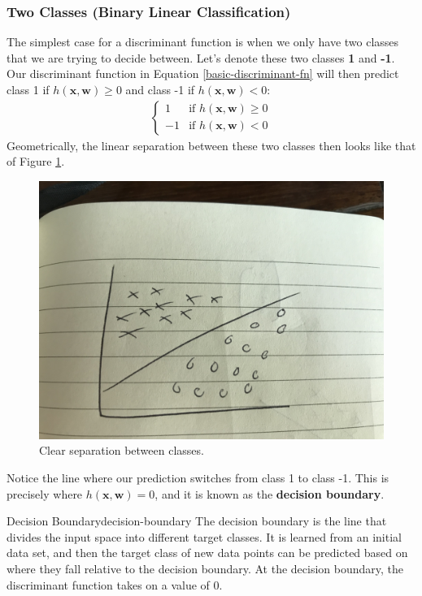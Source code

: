 \subsubsection{Two Classes (Binary Linear Classification)}
The simplest case for a discriminant function is when we only have two classes that we are trying to decide between. Let's denote these two classes \textbf{1} and \textbf{-1}. Our discriminant function in Equation \ref{basic-discriminant-fn} will then predict class 1 if $h(\textbf{x}, \textbf{w}) \geq 0$ and class -1 if $h(\textbf{x}, \textbf{w}) < 0$:
\begin{align*}
	\begin{cases} 
    	1 & \text{if } h(\textbf{x}, \textbf{w}) \geq 0 \\
    	-1 & \text{if } h(\textbf{x}, \textbf{w}) < 0
   \end{cases}
\end{align*}
Geometrically, the linear separation between these two classes then looks like that of Figure \ref{fig:lin-sep-bn-classes}.

\begin{figure}
    \centering
    \includegraphics[width=0.5\paperwidth]{../Classification/fig/lin_sep_bn_classes.jpg}
    \caption{Clear separation between classes.}
    \label{fig:lin-sep-bn-classes}
\end{figure}

Notice the line where our prediction switches from class 1 to class -1. This is precisely where $h(\textbf{x}, \textbf{w}) = 0$, and it is known as the \textbf{decision boundary}.

\begin{definition}{Decision Boundary}{decision-boundary}
	The decision boundary is the line that divides the input space into different target classes. It is learned from an initial data set, and then the target class of new data points can be predicted based on where they fall relative to the decision boundary. At the decision boundary, the discriminant function takes on a value of 0.
\end{definition}

